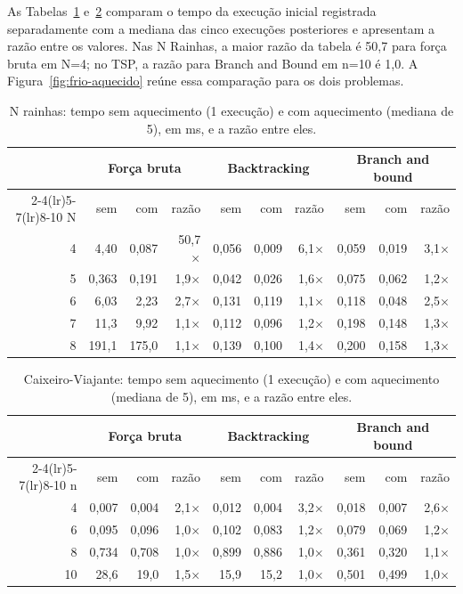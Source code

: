 \documentclass[12pt]{article}
\begin{document}
As Tabelas~\ref{tab:frio-rainhas} e~\ref{tab:frio-tsp} comparam o tempo da execução inicial registrada separadamente com a mediana das cinco execuções posteriores e apresentam a razão entre os valores. Nas N Rainhas, a maior razão da tabela é 50,7 para força bruta em N=4; no TSP, a razão para Branch and Bound em n=10 é 1,0. A Figura~\ref{fig:frio-aquecido} reúne essa comparação para os dois problemas.

\begin{table}[H]
\centering
\caption{N rainhas: tempo sem aquecimento (1 execução) e com aquecimento (mediana de 5), em ms, e a razão entre eles.}
\label{tab:frio-rainhas}
\small
\setlength{\tabcolsep}{3pt}
\begin{tabular}{rrrrrrrrrr}
\toprule
 & \multicolumn{3}{c}{Força bruta} & \multicolumn{3}{c}{Backtracking} & \multicolumn{3}{c}{Branch and bound} \\
\cmidrule(lr){2-4}\cmidrule(lr){5-7}\cmidrule(lr){8-10}
N & sem & com & razão & sem & com & razão & sem & com & razão \\
\midrule
4 & 4,40  & 0,087 & 50,7$\times$ & 0,056 & 0,009 & 6,1$\times$ & 0,059 & 0,019 & 3,1$\times$ \\
5 & 0,363 & 0,191 & 1,9$\times$  & 0,042 & 0,026 & 1,6$\times$ & 0,075 & 0,062 & 1,2$\times$ \\
6 & 6,03  & 2,23  & 2,7$\times$  & 0,131 & 0,119 & 1,1$\times$ & 0,118 & 0,048 & 2,5$\times$ \\
7 & 11,3  & 9,92  & 1,1$\times$  & 0,112 & 0,096 & 1,2$\times$ & 0,198 & 0,148 & 1,3$\times$ \\
8 & 191,1 & 175,0 & 1,1$\times$  & 0,139 & 0,100 & 1,4$\times$ & 0,200 & 0,158 & 1,3$\times$ \\
\bottomrule
\end{tabular}
\end{table}

\begin{table}[H]
\centering
\caption{Caixeiro-Viajante: tempo sem aquecimento (1 execução) e com aquecimento (mediana de 5), em ms, e a razão entre eles.}
\label{tab:frio-tsp}
\small
\setlength{\tabcolsep}{3pt}
\begin{tabular}{rrrrrrrrrr}
\toprule
 & \multicolumn{3}{c}{Força bruta} & \multicolumn{3}{c}{Backtracking} & \multicolumn{3}{c}{Branch and bound} \\
\cmidrule(lr){2-4}\cmidrule(lr){5-7}\cmidrule(lr){8-10}
n & sem & com & razão & sem & com & razão & sem & com & razão \\
\midrule
4  & 0,007 & 0,004 & 2,1$\times$ & 0,012 & 0,004 & 3,2$\times$ & 0,018 & 0,007 & 2,6$\times$ \\
6  & 0,095 & 0,096 & 1,0$\times$ & 0,102 & 0,083 & 1,2$\times$ & 0,079 & 0,069 & 1,2$\times$ \\
8  & 0,734 & 0,708 & 1,0$\times$ & 0,899 & 0,886 & 1,0$\times$ & 0,361 & 0,320 & 1,1$\times$ \\
10 & 28,6  & 19,0  & 1,5$\times$ & 15,9  & 15,2  & 1,0$\times$ & 0,501 & 0,499 & 1,0$\times$ \\
\bottomrule
\end{tabular}
\end{table}
\end{document}

